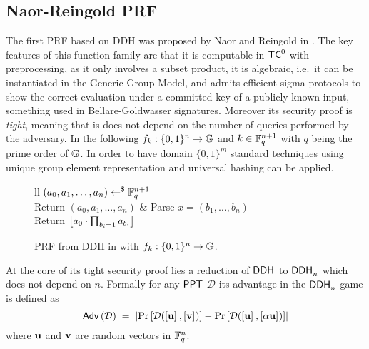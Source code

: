 
\subsection{Naor-Reingold PRF}
The first PRF based on DDH was proposed by Naor and Reingold in \cite{FOCS:NaoRei97}.
The key features of this function family are that it is computable in $\mathsf{TC}^0$ with preprocessing, as it only involves a subset product, it is algebraic, i.e.\ it can be instantiated in the Generic Group Model, and admits efficient sigma protocols to show the correct evaluation under a committed key of a publicly known input, something used in Bellare-Goldwasser \cite{C:BelGol89} signatures.
Moreover its security proof is \textit{tight}, meaning that is does not depend on the number of queries performed by the adversary.
In the following $f_k: \{0, 1\}^n \to \mathbb{G}$ and $k \in \mathbb{F}_q^{n+1}$ with $q$ being the prime order of $\mathbb{G}$.
In order to have domain $\{0, 1\}^m$ standard techniques using unique group element representation and universal hashing can be applied.

\begin{figure}[htb]
\centering
\begin{pcarray}{ll}
		{
			$(a_0, a_1, \ldots, a_n) \gets^{\$} \mathbb{F}_q^{n+1}$
				\\
			Return $(a_0, a_1, \ldots, a_n)$
		}
			&
		{
			Parse $x = (b_1, \ldots, b_n)$
				\\
			Return $\left[{a_0 \cdot \prod_{b_i = 1} a_{b_i}}\right]_{}$
		}
\end{pcarray}
\caption{PRF from DDH in \cite{FOCS:NaoRei97} with $f_k: \{0, 1\}^n \to \mathbb{G}$.}
\label{prot:NaoRei88:prf_from_ddh}
\end{figure}

At the core of its tight security proof lies a reduction of $\mathsf{DDH}^{}$ to $\mathsf{DDH}^{}_n$ which does not depend on $n$. Formally for any $\mathsf{PPT}$ $\mathcal{D}$ its advantage in the $\mathsf{DDH}^{}_n$ game is defined as
\[
	\mathsf{Adv}\left(\mathcal{D}\right)
		\; = \;
	\left|
		\Pr \left[ \mathcal{D}(\left[{\mathbf{u}}\right]_{}, \left[{\mathbf{v}}\right]_{}) \right]
			-
		\Pr \left[ \mathcal{D}(\left[{\mathbf{u}}\right]_{}, \left[{\alpha \mathbf{u}}\right]_{}) \right]
	\right|
\]
where $\mathbf{u}$ and $\mathbf{v}$ are random vectors in $\mathbb{F}_q^n$.

